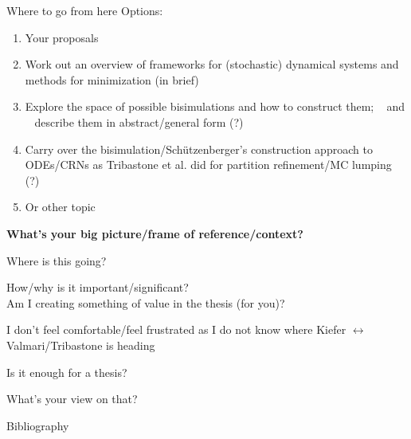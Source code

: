 \documentclass[rgb, pdf]{beamer}
\begin{document}
    \begin{frame}[allowframebreaks]{Where to go from here}
    Options:
     \begin{enumerate}
     \item Your proposals
     \item Work out an overview of frameworks for (stochastic) dynamical systems and methods for minimization (in brief)
      \item Explore the space of possible bisimulations and how to construct them; ~\autocite{buchholz2008bisimulation} and ~\autocite{schutz} describe them in abstract/general form (?)
      \item Carry over the bisimulation/Schützenberger's construction approach to ODEs/CRNs as Tribastone et al. did for partition refinement/MC lumping (?)
      \item Or other topic
    \end{enumerate}
      \framebreak
      
    \textbf{What's your big picture/frame of reference/context?} \\ \vspace{0.6cm}
    
    Where is this going? \\ \vspace{0.6cm}
    
    How/why is it important/significant? \\
    Am I creating something of value in the thesis (for you)?\\ \vspace{0.6cm}
     
    I don't feel comfortable/feel frustrated as I do not know where Kiefer $\leftrightarrow$ Valmari/Tribastone is heading \\ \vspace{0.6cm}
    
    Is it enough for a thesis? \\ \vspace{0.6cm}
    
    What's your view on that?
    \end{frame}
    
        
    \begin{frame}{Bibliography}
        \printbibliography
    \end{frame}
\end{document}
